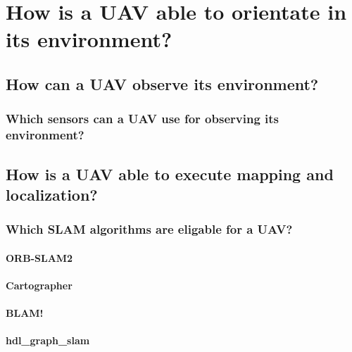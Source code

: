 \documentclass[12pt, a4paper]{report}
\begin{document}
    \section{How is a UAV able to orientate in its environment?}
    
      \subsection{How can a UAV observe its environment?}
      
        \subsubsection{Which sensors can a UAV use for observing its environment?}
        
      \subsection{How is a UAV able to execute mapping and localization?}
      
        \subsubsection{Which SLAM algorithms are eligable for a UAV?}
        
          \paragraph{ORB\hyp{}SLAM2}
          
          \paragraph{Cartographer}
          
          \paragraph{BLAM!}
          
          \paragraph{hdl\_graph\_slam}
          
\end{document}
